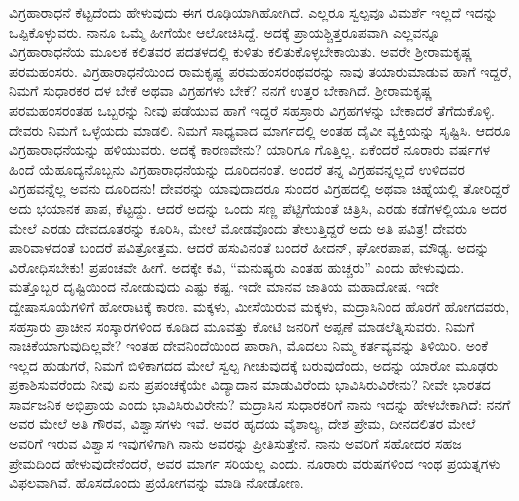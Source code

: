 ವಿಗ್ರಹಾರಾಧನೆ ಕೆಟ್ಟದೆಂದು ಹೇಳುವುದು ಈಗ ರೂಢಿಯಾಗಿಹೋಗಿದೆ. ಎಲ್ಲರೂ ಸ್ವಲ್ಪವೂ ವಿಮರ್ಶೆ ಇಲ್ಲದೆ ಇದನ್ನು ಒಪ್ಪಿಕೊಳ್ಳುವರು. ನಾನೂ ಒಮ್ಮೆ ಹೀಗೆಯೇ ಆಲೋಚಿ\-ಸಿದ್ದೆ. ಅದಕ್ಕೆ ಪ್ರಾಯಶ್ಚಿತ್ತರೂಪವಾಗಿ ಎಲ್ಲವನ್ನೂ ವಿಗ್ರಹಾರಾಧನೆಯ ಮೂಲಕ ಕಲಿತವರ ಪದತಳದಲ್ಲಿ ಕುಳಿತು ಕಲಿತುಕೊಳ್ಳಬೇಕಾಯಿತು. ಅವರೇ ಶ‍್ರೀರಾಮಕೃಷ್ಣ ಪರಮಹಂಸರು. ವಿಗ್ರಹಾರಾಧನೆಯಿಂದ ರಾಮಕೃಷ್ಣ ಪರಮಹಂಸರಂಥವರನ್ನು ನಾವು ತಯಾರು\-ಮಾಡುವ ಹಾಗೆ ಇದ್ದರೆ, ನಿಮಗೆ ಸುಧಾರಕರ ದಳ ಬೇಕೆ ಅಥವಾ ವಿಗ್ರಹಗಳು ಬೇಕೆ? ನನಗೆ ಉತ್ತರ ಬೇಕಾಗಿದೆ. ಶ‍್ರೀರಾಮಕೃಷ್ಣ ಪರಮಹಂಸರಂತಹ ಒಬ್ಬರನ್ನು ನೀವು ಪಡೆಯುವ ಹಾಗೆ ಇದ್ದರೆ ಸಹಸ್ರಾರು ವಿಗ್ರಹಗಳನ್ನು ಬೇಕಾದರೆ ತೆಗೆದುಕೊಳ್ಳಿ. ದೇವರು ನಿಮಗೆ ಒಳ್ಳೆಯದು ಮಾಡಲಿ. ನಿಮಗೆ ಸಾಧ್ಯವಾದ ಮಾರ್ಗದಲ್ಲಿ ಅಂತಹ ದೈವೀ ವ್ಯಕ್ತಿಯನ್ನು ಸೃಷ್ಟಿಸಿ. ಆದರೂ ವಿಗ್ರಹಾರಾಧನೆಯನ್ನು ಹಳಿಯುವರು. ಅದಕ್ಕೆ ಕಾರಣವೇನು? ಯಾರಿಗೂ ಗೊತ್ತಿಲ್ಲ. ಏಕೆಂದರೆ ನೂರಾರು ವರ್ಷಗಳ ಹಿಂದೆ ಯೆಹೂದ್ಯನೊಬ್ಬನು ವಿಗ್ರಹಾ\-ರಾಧನೆಯನ್ನು ದೂರಿದನಂತೆ. ಅಂದರೆ ತನ್ನ ವಿಗ್ರಹವನ್ನಲ್ಲದೆ ಉಳಿದವರ ವಿಗ್ರಹವನ್ನೆಲ್ಲ ಅವನು ದೂರಿದನು! ದೇವರನ್ನು ಯಾವುದಾದರೂ ಸುಂದರ ವಿಗ್ರಹದಲ್ಲಿ ಅಥವಾ ಚಿಹ್ನೆಯಲ್ಲಿ ತೋರಿದ್ದರೆ ಅದು ಭಯಾನಕ ಪಾಪ, ಕೆಟ್ಟದ್ದು. ಆದರೆ ಅದನ್ನು ಒಂದು ಸಣ್ಣ ಪೆಟ್ಟಿಗೆಯಂತೆ ಚಿತ್ರಿಸಿ, ಎರಡು ಕಡೆಗಳಲ್ಲಿಯೂ ಅದರ ಮೇಲೆ ಎರಡು ದೇವದೂತರನ್ನು ಕೂರಿಸಿ, ಮೇಲೆ ಮೋಡವೊಂದು ತೇಲುತ್ತಿದ್ದರೆ ಅದು ಅತಿ ಪವಿತ್ರ! ದೇವರು ಪಾರಿವಾಳ\-ದಂತೆ ಬಂದರೆ ಪವಿತ್ರೋತ್ತಮ. ಆದರೆ ಹಸುವಿನಂತೆ ಬಂದರೆ ಹೀದನ್​, ಘೋರಪಾಪ, ಮೌಢ್ಯ. ಅದನ್ನು ವಿರೋಧಿಸಬೇಕು! ಪ್ರಪಂಚವೇ ಹೀಗೆ. ಅದಕ್ಕೇ ಕವಿ, “ಮನುಷ್ಯರು ಎಂತಹ ಹುಚ್ಚರು” ಎಂದು ಹೇಳುವುದು. ಮತ್ತೊಬ್ಬರ ದೃಷ್ಟಿಯಿಂದ ನೋಡುವುದು ಎಷ್ಟು ಕಷ್ಟ. ಇದೇ ಮಾನವ ಜಾತಿಯ ಮಹಾದೋಷ. ಇದೇ ದ್ವೇಷಾಸೂಯೆಗಳಿಗೆ ಹೋರಾಟಕ್ಕೆ ಕಾರಣ. ಮಕ್ಕಳು, ಮೀಸೆಯಿರುವ ಮಕ್ಕಳು, ಮದ್ರಾಸಿನಿಂದ ಹೊರಗೆ ಹೋಗದವರು, ಸಹಸ್ರಾರು ಪ್ರಾಚೀನ ಸಂಸ್ಕಾರಗಳಿಂದ ಕೂಡಿದ ಮೂವತ್ತು ಕೋಟಿ ಜನರಿಗೆ ಅಪ್ಪಣೆ ಮಾಡಲೆತ್ನಿಸುವರು. ನಿಮಗೆ ನಾಚಿಕೆಯಾಗುವುದಿಲ್ಲವೇ? ಇಂತಹ ದೇವನಿಂದೆಯಿಂದ ಪಾರಾಗಿ, ಮೊದಲು ನಿಮ್ಮ ಕರ್ತವ್ಯವನ್ನು ತಿಳಿಯಿರಿ. ಅಂಕೆ ಇಲ್ಲದ ಹುಡುಗರೆ, ನಿಮಗೆ ಬಿಳಿಕಾಗದದ ಮೇಲೆ ಸ್ವಲ್ಪ ಗೀಚುವುದಕ್ಕೆ ಬರುವುದೆಂದು, ಅದನ್ನು ಯಾರೋ ಮೂಢರು ಪ್ರಕಾಶಿಸುವರೆಂದು ನೀವು ಏನು ಪ್ರಪಂಚಕ್ಕೆಯೇ ವಿದ್ಯಾದಾನ ಮಾಡುವಿರೆಂದು ಭಾವಿಸಿರುವಿರೇನು? ನೀವೇ ಭಾರತದ ಸಾರ್ವಜನಿಕ ಅಭಿಪ್ರಾಯ ಎಂದು ಭಾವಿಸಿರುವಿರೇನು? ಮದ್ರಾಸಿನ ಸುಧಾರಕರಿಗೆ ನಾನು ಇದನ್ನು ಹೇಳಬೇಕಾಗಿದೆ: ನನಗೆ ಅವರ ಮೇಲೆ ಅತಿ ಗೌರವ, ವಿಶ್ವಾಸಗಳು ಇವೆ. ಅವರ ಹೃದಯ ವೈಶಾಲ್ಯ, ದೇಶ ಪ್ರೇಮ, ದೀನದಲಿತರ ಮೇಲೆ ಅವರಿಗೆ ಇರುವ ವಿಶ್ವಾಸ ಇವುಗಳಿಗಾಗಿ ನಾನು ಅವರನ್ನು ಪ್ರೀತಿಸುತ್ತೇನೆ. ನಾನು ಅವರಿಗೆ ಸಹೋದರ ಸಹಜ ಪ್ರೇಮದಿಂದ ಹೇಳುವುದೇನೆಂದರೆ, ಅವರ ಮಾರ್ಗ ಸರಿಯಲ್ಲ ಎಂದು. ನೂರಾರು ವರುಷಗಳಿಂದ ಇಂಥ ಪ್ರಯತ್ನಗಳು ವಿಫಲವಾಗಿವೆ. ಹೊಸದೊಂದು ಪ್ರಯೋಗವನ್ನು ಮಾಡಿ ನೋಡೋಣ.

\vskip   4pt

